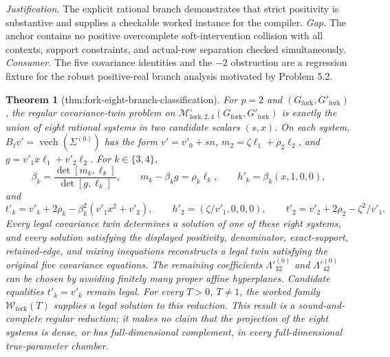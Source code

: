\documentclass{article}
\newtheorem{theorem}{Theorem}
\begin{document}
\par\smallskip\noindent \textit{Justification.} The explicit rational branch demonstrates that strict positivity is substantive and supplies a checkable worked instance for the compiler. \textit{Gap.} The anchor contains no positive overcomplete soft-intervention collision with all contexts, support constraints, and actual-row separation checked simultaneously. \textit{Consumer.} The five covariance identities and the \(-2\) obstruction are a regression fixture for the robust positive-real branch analysis motivated by Problem 5.2.

\begin{theorem}[thm:fork-eight-branch-classification]\label{thm:fork-eight-branch-classification}
For \(p=2\) and \((G_{\mathrm{fork}},G'_{\mathrm{fork}})\), the regular covariance-twin problem on \(\mathcal M^{\circ}_{\mathrm{fork},2,4}(G_{\mathrm{fork}},G'_{\mathrm{fork}})\) is exactly the union of eight rational systems in two candidate scalars \((s,x)\).  On each system, \(B_{\ell}v'=\operatorname{vech}(\Sigma^{(0)})\) has the form \(v'=v'_0+sn\), \(m_2=\zeta\ell_1+\rho_2\ell_2\), and \(g=v'_1x\ell_1+v'_2\ell_2\).  For \(k\in\{3,4\}\),
\[
 \beta_k=\frac{\det[m_k,\ell_k]}{\det[g,\ell_k]},\qquad
 m_k-\beta_kg=\rho_k\ell_k,\qquad
 h'_k=\beta_k(x,1,0,0),
\]
and
\[
 t'_k=v'_k+2\rho_k-\beta_k^2(v'_1x^2+v'_2),
 \qquad
 h'_2=(\zeta/v'_1,0,0,0),
 \qquad
 t'_2=v'_2+2\rho_2-\zeta^2/v'_1.
\]
Every legal covariance twin determines a solution of one of these eight systems, and every solution satisfying the displayed positivity, denominator, exact-support, retained-edge, and mixing inequations reconstructs a legal twin satisfying the original five covariance equations.  The remaining coefficients \(\Lambda'^{(0)}_{32}\) and \(\Lambda'^{(0)}_{42}\) can be chosen by avoiding finitely many proper affine hyperplanes.  Candidate equalities \(t'_k=v'_k\) remain legal.  For every \(T>0\), \(T\ne1\), the worked family \(\mathcal W_{\mathrm{fork}}(T)\) supplies a legal solution to this reduction.  This result is a sound-and-complete regular reduction; it makes no claim that the projection of the eight systems is dense, or has full-dimensional complement, in every full-dimensional true-parameter chamber.
\end{theorem}
\end{document}
